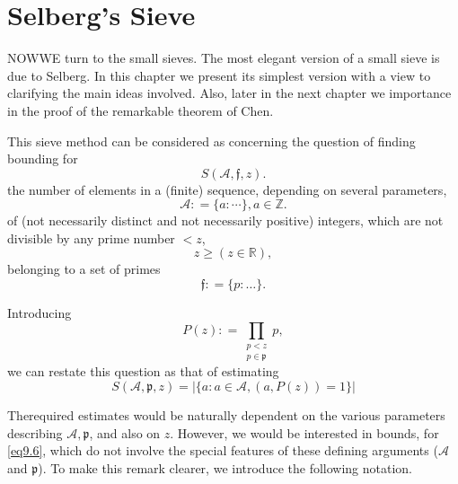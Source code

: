 
\chapter{Selberg's Sieve}\label{chap9}

NOW\pageoriginale WE turn to the small sieves. The most elegant
version of a small sieve is due to Selberg. In this chapter we present
its simplest version with a view to clarifying the main ideas
involved. Also, later in the next chapter we importance in the proof
of the remarkable theorem of Chen. 

This sieve method can be considered as concerning the question of
finding bounding for  
\begin{equation*}
S (\mathscr{A}, \mathfrak{f}, z).\tag{9.1}\label{eq9.1}
\end{equation*}
the number of elements in a (finite) sequence, depending on several
parameters, 
\begin{equation*}
\mathscr{A}: = \{a: \cdots \}, a \in \mathbb{Z}.\tag{9.2}\label{eq9.2}
\end{equation*}
of (not necessarily distinct and not necessarily positive) integers,
which are not divisible by any prime number $< z$, 
\begin{equation*}
z \geq  (z \in \mathbb{R}),\tag{9.3}\label{eq9.3}
\end{equation*}
belonging to a set of primes 
\begin{equation*}
\mathfrak{f}: = \{ p : \ldots \}.\tag{9.4}\label{eq9.4}
\end{equation*}

Introducing 
\begin{equation*}
P(z): =\prod_{\substack{p<z\\ p \in
    \mathfrak{p}}}p,\tag{9.5}\label{eq9.5} 
\end{equation*}
we can restate this question as that of estimating 
\begin{equation*}
S(\mathscr{A},\mathfrak{p},z) =| \{ a: a \in \mathscr{A},(a, P(z))=1\}
|\tag{9.6}\label{eq9.6} 
\end{equation*}

The\pageoriginale required estimates would be naturally dependent on the various
parameters describing $\mathscr{A}, \mathfrak{p}$, and also on
$z$. However, we would be interested in bounds, for \eqref{eq9.6}, which do
not involve the special features of these defining arguments
($\mathscr{A}$ and $\mathfrak{p}$). To make  this
remark clearer, we introduce the following notation.  

